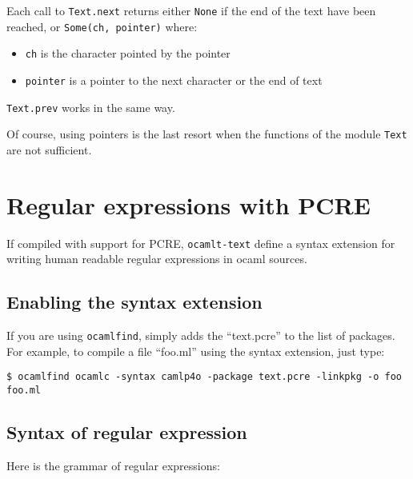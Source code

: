 \documentclass{article}
\newcommand{\oct}{\texttt{ocamlt-text}\xspace}
\begin{document}
Each call to \texttt{Text.next} returns either \texttt{None} if the
end of the text have been reached, or \texttt{Some(ch, pointer)} where:

\begin{itemize}
\item \texttt{ch} is the character pointed by the pointer
\item \texttt{pointer} is a pointer to the next character or the end of text
\end{itemize}

\texttt{Text.prev} works in the same way.

Of course, using pointers is the last resort when the functions of the
module \texttt{Text} are not sufficient.

\section{Regular expressions with PCRE}

If compiled with support for PCRE, \oct define a syntax extension for
writing human readable regular expressions in ocaml sources.

\subsection{Enabling the syntax extension}

If you are using \texttt{ocamlfind}, simply adds the ``text.pcre'' to
the list of packages. For example, to compile a file ``foo.ml'' using
the syntax extension, just type:

\lstset{language=[Objective]Caml}\begin{lstlisting}
$ ocamlfind ocamlc -syntax camlp4o -package text.pcre -linkpkg -o foo foo.ml
\end{lstlisting}

\subsection{Syntax of regular expression}

Here is the grammar of regular expressions:
\end{document}
